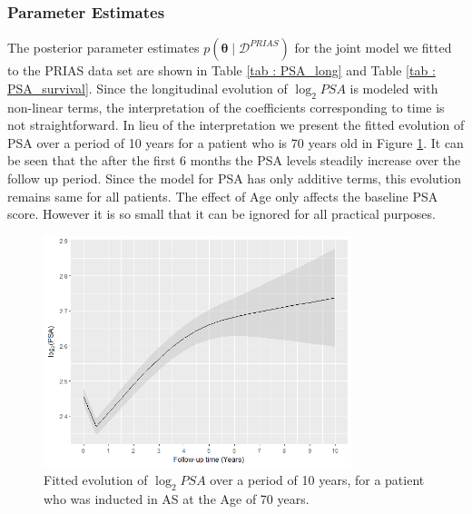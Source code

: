 \subsubsection{Parameter Estimates}
\label{subsec : param_estimates_jm_fit_prias}
The posterior parameter estimates $p(\boldsymbol{\theta} \mid \mathcal{D}^{PRIAS})$ for the joint model we fitted to the PRIAS data set are shown in Table \ref{tab : PSA_long} and Table \ref{tab : PSA_survival}. Since the longitudinal evolution of $\log_2 PSA$ is modeled with non-linear terms, the interpretation of the coefficients corresponding to time is not straightforward. In lieu of the interpretation we present the fitted evolution of PSA over a period of 10 years for a patient who is 70 years old in Figure \ref{fig : fitted_trend_psa}. It can be seen that the after the first 6 months the PSA levels steadily increase over the follow up period. Since the model for PSA has only additive terms, this evolution remains same for all patients. The effect of Age only affects the baseline PSA score. However it is so small that it can be ignored for all practical purposes.\\

\begin{figure}[!htb]
	\centering
    \captionsetup{justification=centering}
	\includegraphics[width=0.8\textwidth]{images/fitted_trend_psa.png}
	\caption{Fitted evolution of $\log_2 PSA$ over a period of 10 years, for a patient who was inducted in AS at the Age of 70 years.}
	\label{fig : fitted_trend_psa}
\end{figure}

